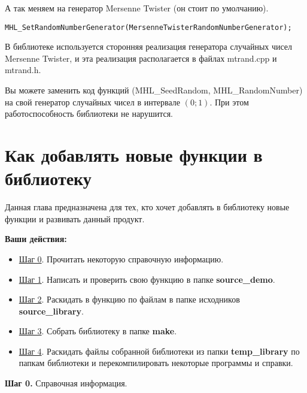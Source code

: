 \documentclass[a4paper,12pt]{article}
\begin{document}
А так меняем на генератор Mersenne Twister (он стоит по умолчанию).
\begin{lstlisting}[label=SetRandomNumberGenerator,caption=Меняем на генератор случайных чисел Mersenne Twister]
MHL_SetRandomNumberGenerator(MersenneTwisterRandomNumberGenerator);
\end{lstlisting}

В библиотеке используется сторонняя реализация генератора случайных чисел Mersenne Twister, и эта реализация располагается в файлах mtrand.cpp и mtrand.h.

Вы можете заменить код функций (MHL\_SeedRandom, MHL\_RandomNumber) на свой генератор случайных чисел в интервале $\left( 0; 1\right)$. При этом работоспособность библиотеки не нарушится.

\newpage
\section{Как добавлять новые функции в библиотеку}\label{section_addnew}

Данная глава предназначена для тех, кто хочет добавлять в библиотеку новые функции и развивать данный продукт.

\textbf{Ваши действия:}

\begin{itemize}
\item \hyperref[step0]{Шаг 0}. Прочитать некоторую справочную информацию.
\item \hyperref[step1]{Шаг 1}. Написать и проверить свою функцию в папке \textbf{source\_demo}.
\item \hyperref[step2]{Шаг 2}. Раскидать в функцию по файлам в папке исходников \textbf{source\_library}.
\item \hyperref[step3]{Шаг 3}. Собрать библиотеку в папке \textbf{make}.
\item \hyperref[step4]{Шаг 4}. Раскидать файлы собранной библиотеки из папки \textbf{temp\_library} по папкам библиотеки и перекомпилировать некоторые программы и справки.
\end{itemize}

\textbf{Шаг 0.} \label{step0} Справочная информация.
\end{document}
